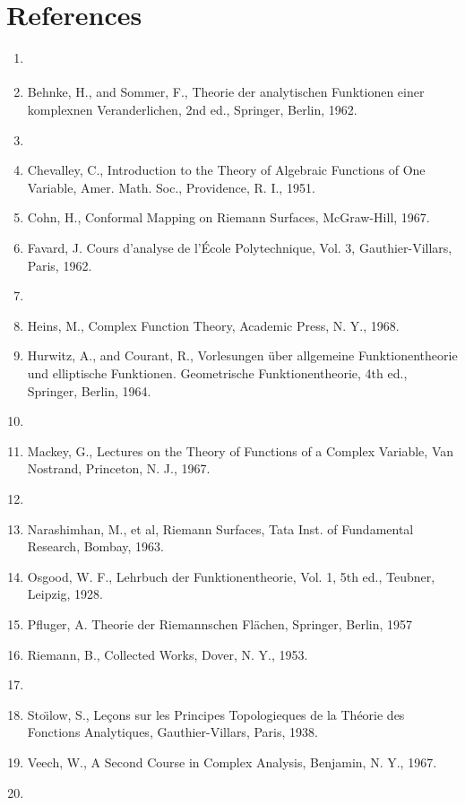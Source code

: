 \documentclass[a4paper,11pt]{article}
\begin{document}
\section{References}

\begin{enumerate}
\itemsep=0pt
\parskip=0pt
\item \cite{ahlfors60:_rieman_surfac}
\item Behnke, H., and Sommer, F., Theorie der analytischen Funktionen
  einer komplexnen Veranderlichen, 2nd ed., Springer, Berlin, 1962.
\item \cite{bers58:_rieman_surfac}
\item Chevalley, C., Introduction to the Theory of Algebraic Functions
  of One Variable, Amer. Math. Soc., Providence, R. I., 1951.
\item Cohn, H., Conformal Mapping on Riemann Surfaces, McGraw-Hill,
  1967.
\item Favard, J. Cours d'analyse de l'{\'E}cole Polytechnique, Vol. 3,
  Gauthier-Villars, Paris, 1962.
\item \cite{gunning66:_lectur_rieman_surfac}
\item Heins, M., Complex Function Theory, Academic Press, N. Y., 1968.
\item Hurwitz, A., and Courant, R., Vorlesungen \"uber allgemeine
  Funktionentheorie und elliptische Funktionen.  Geometrische
  Funktionentheorie, 4th ed., Springer, Berlin, 1964.
\item \cite{knopp47:_theor_funct}
\item Mackey, G., Lectures on the Theory of Functions of a Complex
  Variable, Van Nostrand, Princeton, N. J., 1967.
\item \cite{markushevich67:_theor_funct_compl_variab3:da92}
\item Narashimhan, M., et al, Riemann Surfaces, Tata Inst. of
  Fundamental Research, Bombay, 1963.
\item Osgood, W. F., Lehrbuch der Funktionentheorie, Vol. 1, 5th ed.,
  Teubner, Leipzig, 1928.
\item Pfluger, A. Theorie der Riemannschen Fl{\"a}chen, Springer,
  Berlin, 1957
\item Riemann, B., Collected Works, Dover, N. Y., 1953.
\item \cite{springer57:_introd_rieman_surfac:da78}
\item Sto{\"\i}low, S., Le\c{c}ons sur les Principes Topologieques de
  la Th\'eorie des Fonctions Analytiques, Gauthier-Villars, Paris,
  1938.
\item Veech, W., A Second Course in Complex Analysis, Benjamin, N. Y.,
  1967.
\item \cite{weyl64:_concep_rieman_surfac:da111}
\end{enumerate}

\printbibliography
\end{document}
